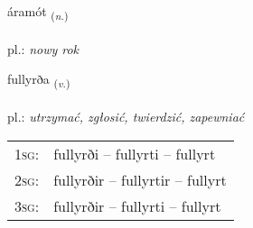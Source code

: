 \documentclass[frontgrid, backgrid]{flacards}\usepackage[]{graphicx}\usepackage[]{xcolor}
\begin{document}
\renewcommand{\flhead}{\vskip5pt \fboxsep=0pt {\small\bfseries\footnotesize Nafnorð | Noun}}
\renewcommand{\fcfoot}{\vskip5pt \fboxsep=0pt \hspace{2pt}{\small\bfseries\footnotesize 2K}}

\renewcommand{\blhead}{\vskip5pt {\small\bfseries\footnotesize Nafnorð | Noun }}
\renewcommand{\bcfoot}{\vskip5pt \hspace{2pt}{\small\bfseries\footnotesize 2K}}


{áramót \small{\textsubscript{(\textit{n.})}} \\[1ex] %
\textphonetic{[auːramout]} \\
pl.: \emph{nowy rok} \\  [2ex]
\renewcommand*{\arraystretch}{0.8}
}

\renewcommand{\flhead}{\vskip5pt \fboxsep=0pt {\small\bfseries\footnotesize Sagnorð | Verb}}
\renewcommand{\fcfoot}{\vskip5pt \fboxsep=0pt \hspace{2pt}{\small\bfseries\footnotesize 2K}}

\renewcommand{\blhead}{\vskip5pt {\small\bfseries\footnotesize Sagnorð | Verb }}
\renewcommand{\bcfoot}{\vskip5pt \hspace{2pt}{\small\bfseries\footnotesize 2K}}


{fullyrða \small{\textsubscript{(\textit{v.})}} \\[1ex] %
\textphonetic{[fʏtlɪrða]} \\
pl.: \emph{utrzymać, zgłosić, twierdzić, zapewniać} \\  [2ex]
\renewcommand*{\arraystretch}{0.8}
\begin{tabular}{p{1cm}l}
\textsc{1sg}: & fullyrði -- fullyrti -- fullyrt \\ 
\textsc{2sg}: & fullyrðir -- fullyrtir -- fullyrt \\ 
\textsc{3sg}: & fullyrðir -- fullyrti -- fullyrt \\ 
\end{tabular}
}
\end{document}
